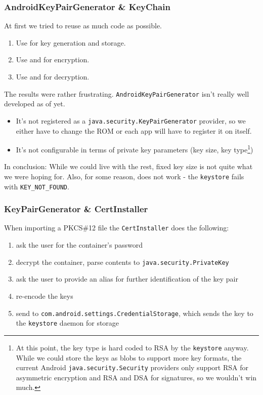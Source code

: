 \documentclass[a4paper,draft]{scrartcl}
\begin{document}
		\subsubsection{AndroidKeyPairGenerator \& KeyChain}
			At first we tried to reuse as much code as possible.		
			\begin{enumerate}
				\item Use  for key generation and storage.
				\item Use  and  for encryption.
				\item Use  and  for decryption.
			\end{enumerate}
			The results were rather frustrating. \texttt{AndroidKeyPairGenerator} isn't really well developed as of yet.
			\begin{itemize}
				\item It's not registered as a \texttt{java.security.KeyPairGenerator} provider, so we either have to change the ROM or each app will have to register it on itself.
				\item It's not configurable in terms of private key parameters (key size, key type\footnote{At this point, the key type is hard coded to RSA by the \texttt{keystore} anyway. While we could store the keys as blobs to support more key formats, the current Android \texttt{java.security.Security} providers only support RSA for asymmetric encryption and RSA and DSA for signatures, so we wouldn't win much.})
			\end{itemize}
			In conclusion: While we could live with the rest, fixed key size is not quite what we were hoping for. Also, for some reason,  does not work - the \texttt{keystore} fails with \texttt{KEY\_NOT\_FOUND}.



		\subsubsection{KeyPairGenerator \& CertInstaller}
			When importing a PKCS\#12 file the \texttt{CertInstaller} does the following:
			\begin{enumerate}
			\item ask the user for the container's password
			\item decrypt the container, parse contents to \texttt{java.security.PrivateKey}
			\item ask the user to provide an alias for further identification of the key pair
			\item re-encode the keys
			\item send to \texttt{com.android.settings.CredentialStorage}, which sends the key to the \texttt{keystore} daemon for storage
			\end{enumerate}
			
\end{document}
